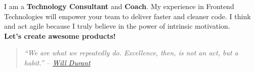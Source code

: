 \documentclass[9pt]{developercv} %
\newenvironment{itquote}
{\begin{quote}\itshape}
{\end{quote}}
\begin{document}

\begin{minipage}[t]{0.4\textwidth} %
	\vspace{-\baselineskip} %
  I am a \textbf{Technology Consultant} and \textbf{Coach}.
  My experience in Frontend Technologies will empower your team to deliver faster and cleaner code.
  I think and act agile because I truly believe in the power of intrinsic motivation.\\
  \textbf{Let's create awesome products!}
  \begin{itquote} 
    ``We are what we repeatedly do. Excellence, then, is not an act, but a habit.'' -- 
    \href{https://medium.com/the-mission/my-favourite-quote-of-all-time-is-a-misattribution-66356f22843d}{Will Durant}\\
  \end{itquote}
\end{minipage}
\hfill %
\begin{minipage}[t]{0.5\textwidth} %
	\vspace{-\baselineskip} %
	\begin{barchart}{5.5}
	\end{barchart}
  \vspace{0.4cm}
\end{minipage}

\begin{center}
\end{center}


\end{document}
